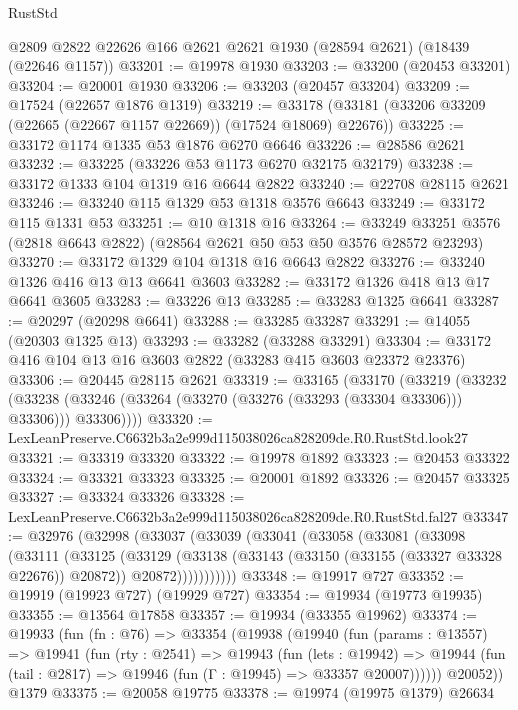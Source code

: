 \begin{lexlean}{RustStd}
\begin{coremodule}
    @2809
    @2822
    @22626
    @166
    @2621
    @2621
    @1930
    (@28594 @2621)
    (@18439 (@22646 @1157))
@33201 := @19978 @1930
@33203 := @33200 (@20453 @33201)
@33204 := @20001 @1930
@33206 := @33203 (@20457 @33204)
@33209 := @17524 (@22657 @1876 @1319)
@33219 := @33178 (@33181 (@33206 @33209 (@22665 (@22667 @1157 @22669)) (@17524 @18069) @22676))
@33225 := @33172 @1174 @1335 @53 @1876 @6270 @6646
@33226 := @28586 @2621
@33232 := @33225 (@33226 @53 @1173 @6270 @32175 @32179)
@33238 := @33172 @1333 @104 @1319 @16 @6644 @2822
@33240 := @22708 @28115 @2621
@33246 := @33240 @115 @1329 @53 @1318 @3576 @6643
@33249 := @33172 @115 @1331 @53
@33251 := @10 @1318 @16
@33264 := @33249 @33251 @3576 (@2818 @6643 @2822) (@28564 @2621 @50 @53 @50 @3576 @28572 @23293)
@33270 := @33172 @1329 @104 @1318 @16 @6643 @2822
@33276 := @33240 @1326 @416 @13 @13 @6641 @3603
@33282 := @33172 @1326 @418 @13 @17 @6641 @3605
@33283 := @33226 @13
@33285 := @33283 @1325 @6641
@33287 := @20297 (@20298 @6641)
@33288 := @33285 @33287
@33291 := @14055 (@20303 @1325 @13)
@33293 := @33282 (@33288 @33291)
@33304 := @33172 @416 @104 @13 @16 @3603 @2822 (@33283 @415 @3603 @23372 @23376)
@33306 := @20445 @28115 @2621
@33319 := @33165
    (@33170
      (@33219
        (@33232
          (@33238 (@33246 (@33264 (@33270 (@33276 (@33293 (@33304 @33306))) @33306))) @33306))))
@33320 := LexLeanPreserve.C6632b3a2e999d115038026ca828209de.R0.RustStd.look27
@33321 := @33319 @33320
@33322 := @19978 @1892
@33323 := @20453 @33322
@33324 := @33321 @33323
@33325 := @20001 @1892
@33326 := @20457 @33325
@33327 := @33324 @33326
@33328 := LexLeanPreserve.C6632b3a2e999d115038026ca828209de.R0.RustStd.fal27
@33347 := @32976
    (@32998
      (@33037
        (@33039
          (@33041
            (@33058
              (@33081
                (@33098
                  (@33111
                    (@33125
                      (@33129
                        (@33138
                          (@33143 (@33150 (@33155 (@33327 @33328 @22676)) @20872))
                          @20872)))))))))))
@33348 := @19917 @727
@33352 := @19919 (@19923 @727) (@19929 @727)
@33354 := @19934 (@19773 @19935)
@33355 := @13564 @17858
@33357 := @19934 (@33355 @19962)
@33374 := @19933
    (fun (fn : @76) =>
    @33354
      (@19938
        (@19940
          (fun (params : @13557) =>
          @19941
            (fun (rty : @2541) =>
            @19943
              (fun (lets : @19942) =>
              @19944 (fun (tail : @2817) => @19946 (fun (Γ : @19945) => @33357 @20007))))))
        @20052))
    @1379
@33375 := @20058 @19775
@33378 := @19974 (@19975 @1379) @26634

\end{coremodule}
\end{lexlean}

